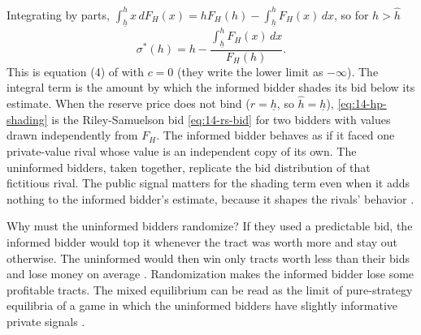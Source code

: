 Integrating by parts, $\int_{\underline h}^h x\,dF_H(x)=hF_H(h)-\int_{\underline h}^hF_H(x)\,dx$, so for
$h>\hat h$
\begin{equation}\label{eq:14-hp-shading}
  \sigma^*(h)=h-\frac{\int_{\underline h}^hF_H(x)\,dx}{F_H(h)}.
\end{equation}
This is equation (4) of \citet{HendricksPorter1988} with $c=0$ (they write the lower limit as $-\infty$). The
integral term is the amount by which the informed bidder shades its bid below its estimate. When the reserve
price does not bind ($r=\underline h$, so $\hat h=\underline h$), \eqref{eq:14-hp-shading} is the
Riley-Samuelson bid \eqref{eq:14-rs-bid} for two bidders with values drawn independently from $F_H$. The
informed bidder behaves as if it faced one private-value rival whose value is an independent copy of its
own. The uninformed bidders, taken together, replicate the bid distribution of that fictitious rival. The
public signal matters for the shading term even when it adds nothing to the informed bidder's estimate,
because it shapes the rivals' behavior \citep[p.~870]{HendricksPorter1988}.

Why must the uninformed bidders randomize? If they used a predictable bid, the informed bidder would top it
whenever the tract was worth more and stay out otherwise. The uninformed would then win only tracts worth less
than their bids and lose money on average \citep[p.~869]{HendricksPorter1988}. Randomization makes the
informed bidder lose some profitable tracts. The mixed equilibrium can be read as the limit of pure-strategy
equilibria of a game in which the uninformed bidders have slightly informative private signals
\citep[pp.~869--870]{HendricksPorter1988}.


